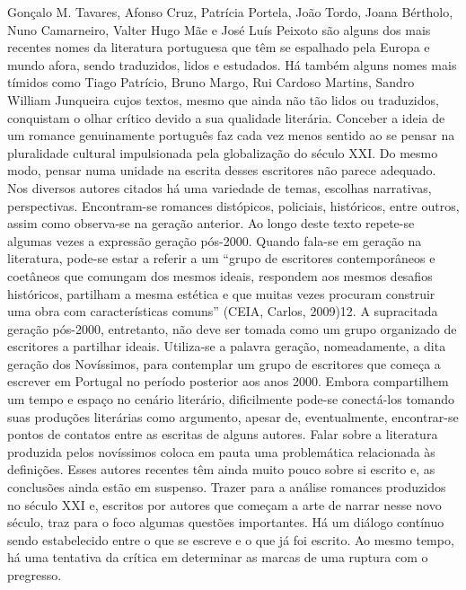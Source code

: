 \documentclass[../DISSERTACAO_MAIN.tex]{subfiles}
\begin{document}
Gonçalo M. Tavares, Afonso Cruz, Patrícia Portela, João Tordo, Joana Bértholo, Nuno Camarneiro, Valter Hugo Mãe e José Luís Peixoto são alguns dos mais recentes nomes da literatura portuguesa que têm se espalhado pela Europa e mundo afora, sendo traduzidos, lidos e estudados. Há também alguns nomes mais tímidos como Tiago Patrício, Bruno Margo, Rui Cardoso Martins, Sandro William Junqueira cujos textos, mesmo que ainda não tão lidos ou traduzidos, conquistam o olhar crítico devido a sua qualidade literária.
Conceber a ideia de um romance genuinamente português faz cada vez menos sentido ao se pensar na pluralidade cultural impulsionada pela globalização do século XXI. Do mesmo modo, pensar numa unidade na escrita desses escritores não parece adequado. Nos diversos autores citados há uma variedade de temas, escolhas narrativas, perspectivas. Encontram-se romances distópicos, policiais, históricos, entre outros, assim como observa-se na geração anterior.
Ao longo deste texto repete-se algumas vezes a expressão geração pós-2000. Quando fala-se em geração na literatura, pode-se estar a referir a um “grupo de escritores contemporâneos e coetâneos que comungam dos mesmos ideais, respondem aos mesmos desafios históricos, partilham a mesma estética e que muitas vezes procuram construir uma obra com características comuns” (CEIA, Carlos, 2009)12. A supracitada geração pós-2000, entretanto, não deve ser tomada como um grupo organizado de escritores a partilhar ideais. Utiliza-se a palavra geração, nomeadamente, a dita geração dos Novíssimos, para contemplar um grupo de escritores que começa a escrever em Portugal no período posterior aos anos 2000. Embora compartilhem um tempo e espaço no cenário literário, dificilmente pode-se conectá-los tomando suas produções literárias como argumento, apesar de, eventualmente, encontrar-se pontos de contatos entre as escritas de alguns autores. 
Falar sobre a literatura produzida pelos novíssimos coloca em pauta uma problemática relacionada às definições. Esses autores recentes têm ainda muito pouco sobre si escrito e, as conclusões ainda estão em suspenso. Trazer para a análise romances produzidos no século XXI e, escritos por autores que começam a arte de narrar nesse novo século, traz para o foco algumas questões importantes. Há um diálogo contínuo sendo estabelecido entre o que se escreve e o que já foi escrito. Ao mesmo tempo, há uma tentativa da crítica em determinar as marcas de uma ruptura com o pregresso.
\end{document}
